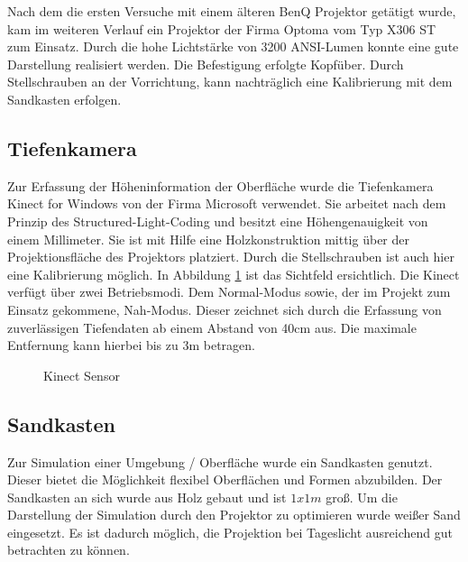 \begin{Spacing}{\mylinespace}
Nach dem die ersten Versuche mit einem älteren BenQ Projektor getätigt wurde, kam im weiteren Verlauf ein Projektor der Firma Optoma vom Typ X306 ST zum Einsatz. Durch die hohe Lichtstärke von 3200 ANSI-Lumen konnte eine gute Darstellung realisiert werden. Die Befestigung erfolgte Kopfüber. Durch Stellschrauben an der Vorrichtung, kann nachträglich eine Kalibrierung mit dem Sandkasten erfolgen.

\subsection{Tiefenkamera}

Zur Erfassung der Höheninformation der Oberfläche wurde die Tiefenkamera Kinect for Windows von der Firma Microsoft verwendet. Sie arbeitet nach dem Prinzip des Structured-Light-Coding und besitzt eine Höhengenauigkeit von einem Millimeter. Sie ist mit Hilfe eine Holzkonstruktion mittig über der Projektionsfläche des Projektors platziert. Durch die Stellschrauben ist auch hier eine Kalibrierung möglich. In Abbildung \ref{fig:fov} ist das Sichtfeld ersichtlich. Die Kinect verfügt über zwei Betriebsmodi. Dem Normal-Modus sowie, der im Projekt zum Einsatz gekommene, Nah-Modus. Dieser zeichnet sich durch die Erfassung von zuverlässigen Tiefendaten ab einem Abstand von 40cm aus. Die maximale Entfernung kann hierbei bis zu 3m betragen.

\begin{figure}[h!]
	\centering
	\vspace{0.2cm}
	\caption{Kinect Sensor}
		\label{fig:fov}
\end{figure}

\subsection{Sandkasten}

Zur Simulation einer Umgebung / Oberfläche wurde ein Sandkasten genutzt. Dieser bietet die Möglichkeit flexibel Oberflächen und Formen abzubilden. Der Sandkasten an sich wurde aus Holz gebaut und ist $1x1m$ groß. Um die Darstellung der Simulation durch den Projektor zu optimieren wurde weißer Sand eingesetzt. Es ist dadurch möglich, die Projektion bei Tageslicht ausreichend gut betrachten zu können.

\end{Spacing}
\newpage
\clearpage
